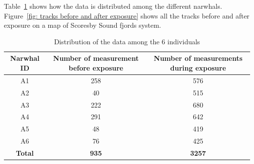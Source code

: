 \documentclass[11pt]{article}
\newcommand {\1}{\mathbb{1}}
\theoremstyle{definition}
\theoremstyle{remark}
\theoremstyle{remark}
\begin{document}
 Table~\ref{table: data distribution}  shows how the data is distributed among the different narwhals. Figure~\ref{fig: tracks before and after exposure} shows all the tracks before and after exposure on a map of Scoresby Sound fjords system.

\begin{table}[H]
	\centering
	\begin{tabular}{|c|c|c|}
		\hline
		Narwhal ID & Number of measurement before exposure & Number of measurements during exposure \\
		\hline
		A1 & 258 & 576\\
		\hline
		A2  & 40 & 515 \\
		\hline
		A3 & 222 & 680 \\
		\hline
		A4 & 291 & 642  \\
		\hline
		A5 & 48 & 419\\
		\hline
		A6 & 76 & 425 \\
		\hline
		\textbf{Total} & \textbf{935} & \textbf{3257} \\
		\hline
	\end{tabular}
	\caption{Distribution of the data among the 6 individuals}
	\label{table: data distribution}
\end{table}
\end{document}
